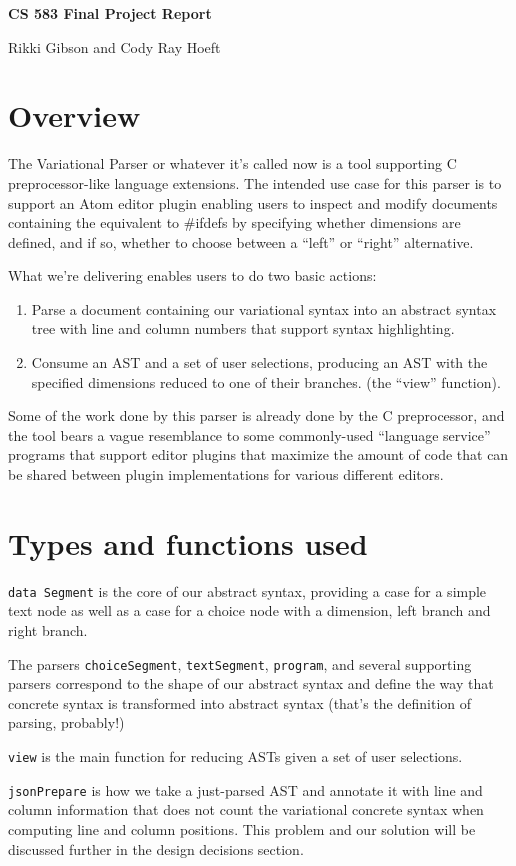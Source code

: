\documentclass[11pt]{article}
\begin{document}
\Large\textbf{CS 583 Final Project Report}

\large{Rikki Gibson and Cody Ray Hoeft}
\normalsize
\section{Overview}
The Variational Parser or whatever it's called now is a tool supporting C preprocessor-like language extensions. The intended use case for this parser is to support an Atom editor plugin enabling users to inspect and modify documents containing the equivalent to \#ifdefs by specifying whether dimensions are defined, and if so, whether to choose between a ``left'' or ``right'' alternative.

What we're delivering enables users to do two basic actions:

\begin{enumerate} 
\item Parse a document containing our variational syntax into an abstract syntax tree with line and column numbers that support syntax highlighting.
\item Consume an AST and a set of user selections, producing an AST with the specified dimensions reduced to one of their branches. (the ``view'' function).
\end{enumerate}
Some of the work done by this parser is already done by the C preprocessor, and the tool bears a vague resemblance to some commonly-used ``language service'' programs that support editor plugins that maximize the amount of code that can be shared between plugin implementations for various different editors.

\section{Types and functions used}
\texttt{data Segment} is the core of our abstract syntax, providing a case for a simple text node as well as a case for a choice node with a dimension, left branch and right branch.

The parsers \texttt{choiceSegment}, \texttt{textSegment}, \texttt{program}, and several supporting parsers correspond to the shape of our abstract syntax and define the way that concrete syntax is transformed into abstract syntax (that's the definition of parsing, probably!)

\texttt{view} is the main function for reducing ASTs given a set of user selections.

\texttt{jsonPrepare} is how we take a just-parsed AST and annotate it with line and column information that does not count the variational concrete syntax when computing line and column positions. This problem and our solution will be discussed further in the design decisions section.
\end{document}
